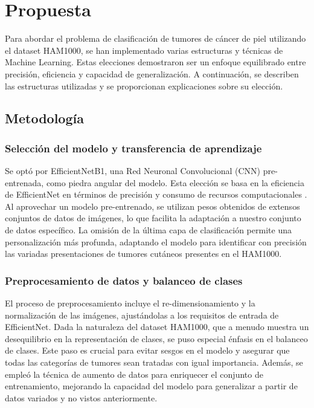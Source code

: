 \chapter{Propuesta}\label{chapter:proposal}

Para abordar el problema de clasificación de tumores de cáncer de piel utilizando el dataset HAM1000, se han implementado varias estructuras y técnicas de Machine Learning. Estas elecciones demostraron ser un enfoque equilibrado entre precisión, eficiencia y capacidad de generalización. A continuación, se describen las estructuras utilizadas y se proporcionan explicaciones sobre su elección.

\section{Metodología}\label{sec:method}

\subsection{Selección del modelo y transferencia de aprendizaje}

Se optó por EfficientNetB1, una Red Neuronal Convolucional (CNN) pre-entrenada, como piedra angular del modelo. Esta elección se basa en la eficiencia de EfficientNet en términos de precisión y consumo de recursos computacionales . Al aprovechar un modelo pre-entrenado, se utilizan pesos obtenidos de extensos conjuntos de datos de imágenes, lo que facilita la adaptación a nuestro conjunto de datos específico. La omisión de la última capa de clasificación permite una personalización más profunda, adaptando el modelo para identificar con precisión las variadas presentaciones de tumores cutáneos presentes en el HAM1000.

\subsection{Preprocesamiento de datos y balanceo de clases}

El proceso de preprocesamiento incluye el re-dimensionamiento y la normalización de las imágenes, ajustándolas a los requisitos de entrada de EfficientNet. Dada la naturaleza del dataset HAM1000, que a menudo muestra un desequilibrio en la representación de clases, se puso especial énfasis en el balanceo de clases. Este paso es crucial para evitar sesgos en el modelo y asegurar que todas las categorías de tumores sean tratadas con igual importancia. Además, se empleó la técnica de aumento de datos para enriquecer el conjunto de entrenamiento, mejorando la capacidad del modelo para generalizar a partir de datos variados y no vistos anteriormente.

